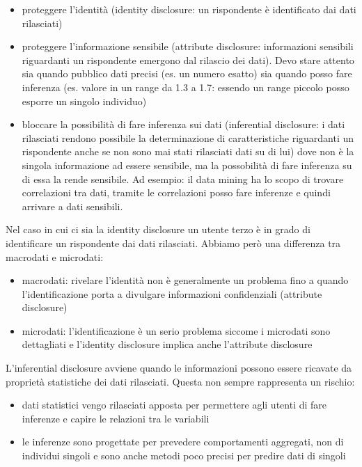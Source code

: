 \begin{itemize}
    \item proteggere l'identità (identity disclosure: un rispondente è identificato dai dati rilasciati)
    \item proteggere l'informazione sensibile (attribute disclosure: informazioni sensibili riguardanti un rispondente emergono dal rilascio dei dati). Devo stare attento sia quando pubblico dati precisi (es. un numero esatto) sia quando posso fare inferenza (es. valore in un range da 1.3 a 1.7: essendo un range piccolo posso esporre un singolo individuo)
    \item bloccare la possibilità di fare inferenza sui dati (inferential disclosure: i dati rilasciati rendono possibile la determinazione di caratteristiche riguardanti un rispondente anche se non sono mai stati rilasciati dati su di lui) dove non è la singola informazione ad essere sensibile, ma la possobilità di fare inferenza su di essa la rende sensibile. Ad esempio: il data mining ha lo scopo di trovare correlazioni tra dati, tramite le correlazioni posso fare inferenze e quindi arrivare a dati sensibili.
\end{itemize}

Nel caso in cui ci sia la identity disclosure un utente terzo è in grado di identificare un rispondente dai dati rilasciati. 
Abbiamo però una differenza tra macrodati e microdati:
\begin{itemize}
    \item macrodati: rivelare l'identità non è generalmente un problema fino a quando l'identificazione porta a divulgare informazioni confidenziali (attribute disclosure)
    \item microdati: l'identificazione è un serio problema siccome i microdati sono dettagliati e l'identity disclosure implica anche l'attribute disclosure
\end{itemize}

L'inferential disclosure avviene quando le informazioni possono essere ricavate da proprietà statistiche dei dati rilasciati. 
Questa non sempre rappresenta un rischio:
\begin{itemize}
    \item dati statistici vengo rilasciati apposta per permettere agli utenti di fare inferenze e capire le relazioni tra le variabili
    \item le inferenze sono progettate per prevedere comportamenti aggregati, non di individui singoli e sono anche metodi poco precisi per predire dati di singoli
\end{itemize}

